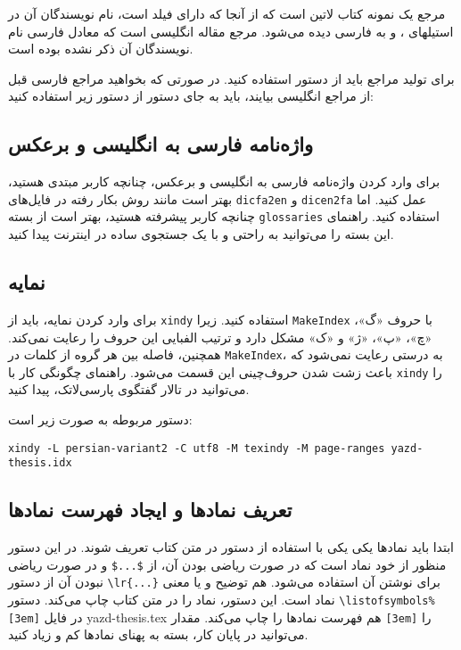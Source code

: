 مرجع \cite{Gonzalez02book} یک نمونه کتاب لاتین است که از آنجا که دارای فیلد  است، نام نویسندگان آن در استیلهای ،  و  به فارسی دیده می‌شود. مرجع \cite{Baker02limits} مقاله انگلیسی است که معادل فارسی نام نویسندگان آن ذکر نشده بوده است.

برای تولید مراجع باید از دستور  استفاده کنید. در صورتی که بخواهید مراجع فارسی قبل از
مراجع انگلیسی بیایند، باید به جای دستور  از دستور زیر استفاده کنید:
\begin{latin}
\end{latin}
\subsection{واژه‌نامه فارسی به انگلیسی و برعکس}
برای وارد کردن واژه‌نامه فارسی به انگلیسی و برعکس، چنانچه کاربر مبتدی هستید، بهتر است مانند روش بکار رفته در فایل‌های 
\verb!dicfa2en!
و
\verb!dicen2fa!
عمل کنید. اما چنانچه کاربر پیشرفته هستید، بهتر است از بسته
\verb!glossaries!
استفاده کنید. راهنمای این بسته را می‌توانید به راحتی و با یک جستجوی ساده در اینترنت پیدا کنید.
\subsection{نمایه}
برای وارد کردن نمایه، باید از 
\verb!xindy!
استفاده کنید. زیرا 
\verb!MakeIndex!
با حروف «گ»، «چ»، «پ»، «ژ» و «ک» مشکل دارد و ترتیب الفبایی این حروف را رعایت نمی‌کند. همچنین، فاصله بین هر گروه از کلمات در 
\verb!MakeIndex!،
به درستی رعایت نمی‌شود که باعث زشت شدن حروف‌چینی این قسمت می‌شود. راهنمای چگونگی کار با 
\verb!xindy! 
را می‌توانید در تالار گفتگوی پارسی‌لاتک، پیدا کنید.

دستور مربوطه به صورت زیر است:

\begin{latin}
\footnotesize
\begin{verbatim}
xindy -L persian-variant2 -C utf8 -M texindy -M page-ranges yazd-thesis.idx
\end{verbatim}
\end{latin}

\subsection{تعریف نمادها و ایجاد فهرست نمادها}
ابتدا باید نمادها یکی یکی با استفاده از دستور
در متن کتاب تعریف شوند. در این دستور منظور از 
خود نماد است که در صورت ریاضی بودن آن، از 
\verb!$...$!
و در صورت ریاضی نبودن آن از دستور
\verb!\lr{...}!
برای نوشتن آن استفاده می‌شود. 
هم توضیح و یا معنی نماد است. این دستور، نماد را در متن کتاب  چاپ می‌کند. دستور
\verb!\listofsymbols%[3em]!
در فایل
\textsf{yazd-thesis.tex}
هم فهرست نمادها را چاپ می‌کند. 
مقدار
\verb![3em]!
را می‌توانید در پایان کار، بسته به پهنای نمادها 
کم و زیاد کنید. 


